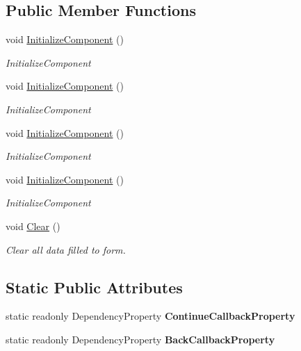 \subsection*{Public Member Functions}
\begin{DoxyCompactItemize}
\item 
void \mbox{\hyperlink{class_wpf_handler_1_1_u_i_1_1_controls_1_1_logon_1_1_registration_panel_a32e00deb7cab659d0c7b677bc32bea18}{Initialize\+Component}} ()
\begin{DoxyCompactList}\small\item\em Initialize\+Component \end{DoxyCompactList}\item 
void \mbox{\hyperlink{class_wpf_handler_1_1_u_i_1_1_controls_1_1_logon_1_1_registration_panel_a32e00deb7cab659d0c7b677bc32bea18}{Initialize\+Component}} ()
\begin{DoxyCompactList}\small\item\em Initialize\+Component \end{DoxyCompactList}\item 
void \mbox{\hyperlink{class_wpf_handler_1_1_u_i_1_1_controls_1_1_logon_1_1_registration_panel_a32e00deb7cab659d0c7b677bc32bea18}{Initialize\+Component}} ()
\begin{DoxyCompactList}\small\item\em Initialize\+Component \end{DoxyCompactList}\item 
void \mbox{\hyperlink{class_wpf_handler_1_1_u_i_1_1_controls_1_1_logon_1_1_registration_panel_a32e00deb7cab659d0c7b677bc32bea18}{Initialize\+Component}} ()
\begin{DoxyCompactList}\small\item\em Initialize\+Component \end{DoxyCompactList}\item 
void \mbox{\hyperlink{class_wpf_handler_1_1_u_i_1_1_controls_1_1_logon_1_1_registration_panel_a0cedeb04a8dd51c128dfb4f44d9dd5fa}{Clear}} ()
\begin{DoxyCompactList}\small\item\em Clear all data filled to form. \end{DoxyCompactList}\end{DoxyCompactItemize}
\subsection*{Static Public Attributes}
\begin{DoxyCompactItemize}
\item 
static readonly Dependency\+Property {\bfseries Continue\+Callback\+Property}
\item 
static readonly Dependency\+Property {\bfseries Back\+Callback\+Property}
\end{DoxyCompactItemize}
